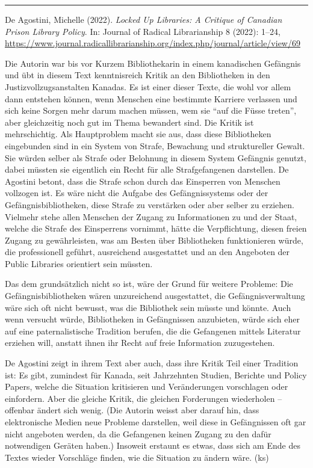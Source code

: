 \documentclass[a4paper,
fontsize=11pt,
oneside,
numbers=noperiodatend,
parskip=half-,
bibliography=totoc,
final
]{scrartcl}
\begin{document}
\begin{center}\rule{0.5\linewidth}{0.5pt}\end{center}

De Agostini, Michelle (2022). \emph{Locked Up Libraries: A Critique of
Canadian Prison Library Policy}. In: Journal of Radical Librarianship 8
(2022): 1--24,
\url{https://www.journal.radicallibrarianship.org/index.php/journal/article/view/69}

Die Autorin war bis vor Kurzem Bibliothekarin in einem kanadischen
Gefängnis und übt in diesem Text kenntnisreich Kritik an den
Bibliotheken in den Justizvollzugsanstalten Kanadas. Es ist einer dieser
Texte, die wohl vor allem dann entstehen können, wenn Menschen eine
bestimmte Karriere verlassen und sich keine Sorgen mehr darum machen
müssen, wem sie \enquote{auf die Füsse treten}, aber gleichzeitig noch
gut im Thema bewandert sind. Die Kritik ist mehrschichtig. Als
Hauptproblem macht sie aus, dass diese Bibliotheken eingebunden sind in
ein System von Strafe, Bewachung und struktureller Gewalt. Sie würden
selber als Strafe oder Belohnung in diesem System Gefängnis genutzt,
dabei müssten sie eigentlich ein Recht für alle Strafgefangenen
darstellen. De Agostini betont, dass die Strafe schon durch das
Einsperren von Menschen vollzogen ist. Es wäre nicht die Aufgabe des
Gefängnissystems oder der Gefängnisbibliotheken, diese Strafe zu
verstärken oder aber selber zu erziehen. Vielmehr stehe allen Menschen
der Zugang zu Informationen zu und der Staat, welche die Strafe des
Einsperrens vornimmt, hätte die Verpflichtung, diesen freien Zugang zu
gewährleisten, was am Besten über Bibliotheken funktionieren würde, die
professionell geführt, ausreichend ausgestattet und an den Angeboten der
Public Libraries orientiert sein müssten.

Das dem grundsätzlich nicht so ist, wäre der Grund für weitere Probleme:
Die Gefängnisbibliotheken wären unzureichend ausgestattet, die
Gefängnisverwaltung wäre sich oft nicht bewusst, was die Bibliothek sein
müsste und könnte. Auch wenn versucht würde, Bibliotheken in
Gefängnissen anzubieten, würde sich eher auf eine paternalistische
Tradition berufen, die die Gefangenen mittels Literatur erziehen will,
anstatt ihnen ihr Recht auf freie Information zuzugestehen.

De Agostini zeigt in ihrem Text aber auch, dass ihre Kritik Teil einer
Tradition ist: Es gibt, zumindest für Kanada, seit Jahrzehnten Studien,
Berichte und Policy Papers, welche die Situation kritisieren und
Veränderungen vorschlagen oder einfordern. Aber die gleiche Kritik, die
gleichen Forderungen wiederholen -- offenbar ändert sich wenig. (Die
Autorin weisst aber darauf hin, dass elektronische Medien neue Probleme
darstellen, weil diese in Gefängnissen oft gar nicht angeboten werden,
da die Gefangenen keinen Zugang zu den dafür notwendigen Geräten haben.)
Insoweit erstaunt es etwas, dass sich am Ende des Textes wieder
Vorschläge finden, wie die Situation zu ändern wäre. (ks)
\end{document}
